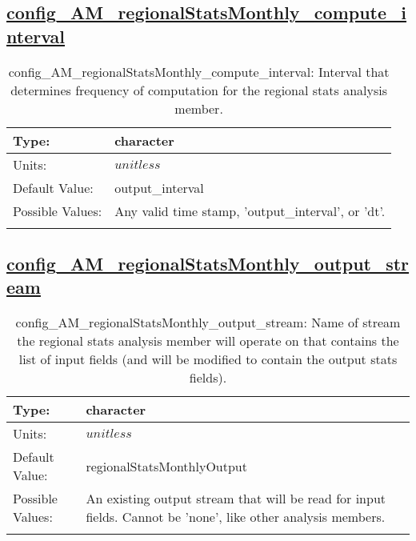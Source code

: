 \subsection[config\_AM\_regionalStatsMonthly\_compute\_interval]{\hyperref[sec:nm_tab_AM_regionalStatsMonthly]{config\_AM\_regionalStatsMonthly\_compute\_interval}}
\label{subsec:nm_sec_config_AM_regionalStatsMonthly_compute_interval}
\begin{center}
\begin{longtable}{| p{2.0in} || p{4.0in} |}
    \hline
    Type: & character \\
    \hline
    Units: & $unitless$ \\
    \hline
    Default Value: & output\_interval \\
    \hline
    Possible Values: & Any valid time stamp, 'output\_interval', or 'dt'. \\
    \hline
    \caption{config\_AM\_regionalStatsMonthly\_compute\_interval: Interval that determines frequency of computation for the regional stats analysis member.}
\end{longtable}
\end{center}
\subsection[config\_AM\_regionalStatsMonthly\_output\_stream]{\hyperref[sec:nm_tab_AM_regionalStatsMonthly]{config\_AM\_regionalStatsMonthly\_output\_stream}}
\label{subsec:nm_sec_config_AM_regionalStatsMonthly_output_stream}
\begin{center}
\begin{longtable}{| p{2.0in} || p{4.0in} |}
    \hline
    Type: & character \\
    \hline
    Units: & $unitless$ \\
    \hline
    Default Value: & regionalStatsMonthlyOutput \\
    \hline
    Possible Values: & An existing output stream that will be read for input fields. Cannot be 'none', like other analysis members. \\
    \hline
    \caption{config\_AM\_regionalStatsMonthly\_output\_stream: Name of stream the regional stats analysis member will operate on that contains the list of input fields (and will be modified to contain the output stats fields).}
\end{longtable}
\end{center}
